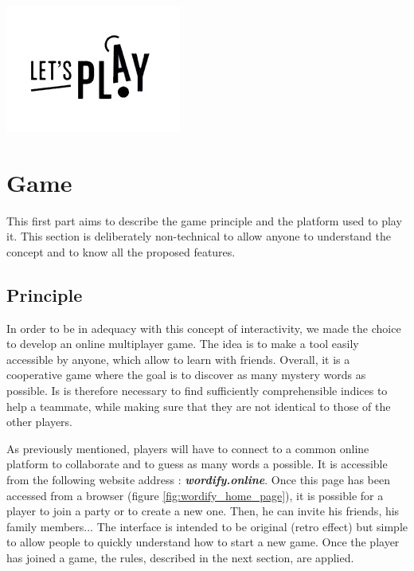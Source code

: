 \documentclass{tnreport}
\begin{document}
\begin{center}
	\includegraphics{figures/lets_play}
\end{center} 

\cleardoublepage

\chapter{Game}

This first part aims to describe the game principle and the platform used to play it. This section is deliberately non-technical to allow anyone to understand the concept and to know all the proposed features. 

\section{Principle}

In order to be in adequacy with this concept of interactivity, we made the choice to develop an online multiplayer game. The idea is to make a tool easily accessible by anyone, which allow to learn with friends. Overall, it is a cooperative game where the goal is to discover as many mystery words as possible. Is is therefore necessary to find sufficiently comprehensible indices to help a teammate, while making sure that they are not identical to those of the other players.

As previously mentioned, players will have to connect to a common online platform to collaborate and to guess as many words a possible. It is accessible from the following website address : \textbf{\textit{wordify.online}}. Once this page has been accessed from a browser (figure \ref{fig:wordify_home_page}), it is possible for a player to join a party or to create a new one. Then, he can invite his friends, his family members... The interface is intended to be original (retro effect) but simple to allow people to quickly understand how to start a new game. Once the player has joined a game, the rules, described in the next section, are applied. 

\end{document}
